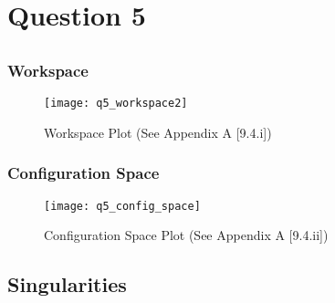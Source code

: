 \newpage
\section{Question 5}
	\subsection{}
		\subsubsection{Workspace}
			\begin{figure}[position = here]
			\begin{centering}
				\texttt{[image: q5\_workspace2]}\\
				\caption [WSpace]{Workspace Plot (See Appendix A [9.4.i])}
			\end{centering}
			\end{figure}
		
		\subsubsection{Configuration Space}
			\begin{figure}[position = here]
			\begin{centering}
				\texttt{[image: q5\_config\_space]}\\
				\caption [CSpace]{Configuration Space Plot (See Appendix A [9.4.ii])}
			\end{centering}
			\end{figure}
	\pagebreak		
	\subsection{Singularities}
